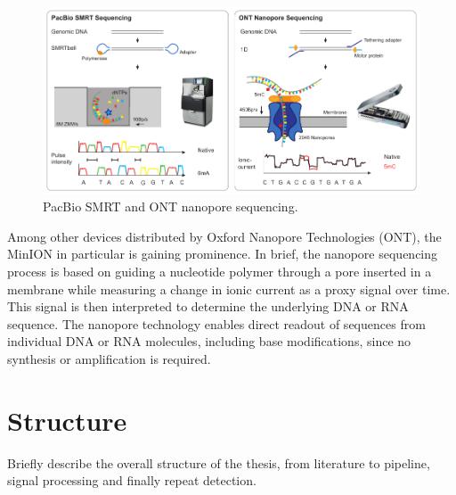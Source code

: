 \begin{figure}[h]
	\centering
	\includegraphics[width=1.0\textwidth]{figures/intro/long_read.pdf}
	\captionsetup{format=plain}
	\caption[Long read sequencing]{PacBio SMRT and ONT nanopore sequencing.}
	\label{fig:intro:longread}
\end{figure}


Among other devices distributed by Oxford Nanopore Technologies (ONT), the MinION in particular is gaining prominence. In brief, the nanopore sequencing process is based on guiding a nucleotide polymer through a pore inserted in a membrane while measuring a change in ionic current as a proxy signal over time. This signal is then interpreted to determine the underlying DNA or RNA sequence. The nanopore technology enables direct readout of sequences from individual DNA or RNA molecules, including base modifications, since no synthesis or amplification is required.




\section{Structure}
\label{sec:intro:structure}

Briefly describe the overall structure of the thesis, from literature to pipeline, signal processing and finally repeat detection.


